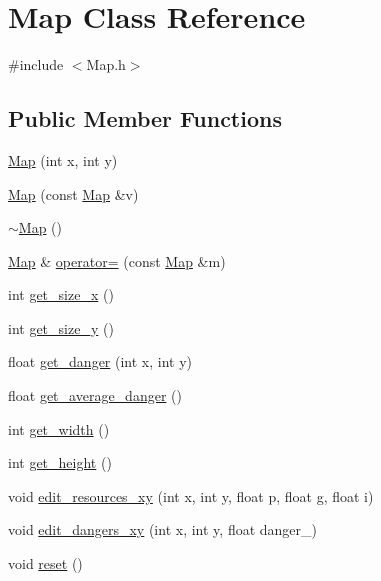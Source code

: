 \hypertarget{class_map}{\section{Map Class Reference}
\label{class_map}
}


{\ttfamily \#include $<$Map.\-h$>$}

\subsection*{Public Member Functions}
\begin{DoxyCompactItemize}
\item 
\hyperlink{class_map_a7dd574b3746a45123fd765945b6a2a7e}{Map} (int x, int y)
\item 
\hyperlink{class_map_ac6a049d836102c0afb564d17b607c67d}{Map} (const \hyperlink{class_map}{Map} \&v)
\item 
\hyperlink{class_map_aa403fbe09394ccf39747588f5168e3b2}{$\sim$\-Map} ()
\item 
\hyperlink{class_map}{Map} \& \hyperlink{class_map_ad1736115fa1c828435ff37df2bb58a0f}{operator=} (const \hyperlink{class_map}{Map} \&m)
\item 
int \hyperlink{class_map_ac33fd4c3249329f4a6d4209046df6dce}{get\-\_\-size\-\_\-x} ()
\item 
int \hyperlink{class_map_a357e44a02b0dc02c139d7207b038a4a3}{get\-\_\-size\-\_\-y} ()
\item 
float \hyperlink{class_map_a1c6b0a40d53eab7cdba41b705a1cce11}{get\-\_\-danger} (int x, int y)
\item 
float \hyperlink{class_map_ac43390d491e18d220a3d94363fdb5ebf}{get\-\_\-average\-\_\-danger} ()
\item 
int \hyperlink{class_map_a38609ea6ce07bc5bb2ea55db6580b355}{get\-\_\-width} ()
\item 
int \hyperlink{class_map_adef9516dd475e67aa7f819a6a358f668}{get\-\_\-height} ()
\item 
void \hyperlink{class_map_a745c069d781baa58e6fc07d5e99ef2ca}{edit\-\_\-resources\-\_\-xy} (int x, int y, float p, float g, float i)
\item 
void \hyperlink{class_map_adc8268424092e8099647d07dfc0a5a14}{edit\-\_\-dangers\-\_\-xy} (int x, int y, float danger\-\_\-)
\item 
void \hyperlink{class_map_a904c445fdce79257fedeba09070cf88a}{reset} ()
\end{DoxyCompactItemize}
